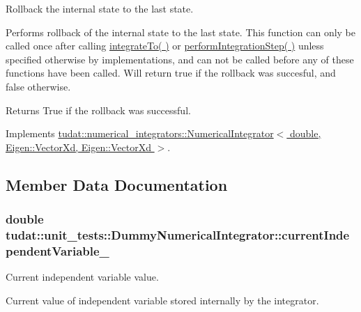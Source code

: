 Rollback the internal state to the last state. 

Performs rollback of the internal state to the last state. This function can only be called once after calling \hyperlink{classtudat_1_1numerical__integrators_1_1NumericalIntegrator_aed0dfa86d274bd9e71c2fd6428edfd3e}{integrate\+To( )} or \hyperlink{classtudat_1_1unit__tests_1_1DummyNumericalIntegrator_aa000aed365de1583a25fd8be85497081}{perform\+Integration\+Step( )} unless specified otherwise by implementations, and can not be called before any of these functions have been called. Will return true if the rollback was succesful, and false otherwise. \begin{DoxyReturn}{Returns}
True if the rollback was successful. 
\end{DoxyReturn}


Implements \hyperlink{classtudat_1_1numerical__integrators_1_1NumericalIntegrator_a87d34e8535b55d430a511fb7e345dc2b}{tudat\+::numerical\+\_\+integrators\+::\+Numerical\+Integrator$<$ double, Eigen\+::\+Vector\+Xd, Eigen\+::\+Vector\+Xd $>$}.



\subsection{Member Data Documentation}
\subsubsection[{\texorpdfstring{current\+Independent\+Variable\+\_\+}{currentIndependentVariable_}}]{\setlength{\rightskip}{0pt plus 5cm}double tudat\+::unit\+\_\+tests\+::\+Dummy\+Numerical\+Integrator\+::current\+Independent\+Variable\+\_\+\hspace{0.3cm}{\ttfamily [protected]}}\hypertarget{classtudat_1_1unit__tests_1_1DummyNumericalIntegrator_a2c55274d8e9f155d59aaa17451d59d7c}{}\label{classtudat_1_1unit__tests_1_1DummyNumericalIntegrator_a2c55274d8e9f155d59aaa17451d59d7c}


Current independent variable value. 

Current value of independent variable stored internally by the integrator. 
